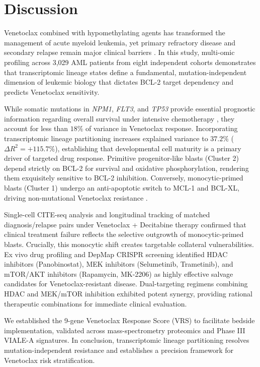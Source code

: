 \documentclass[11pt,a4paper]{article}
\begin{document}
\section{Discussion}

Venetoclax combined with hypomethylating agents has transformed the management of acute myeloid leukemia, yet primary refractory disease and secondary relapse remain major clinical barriers \cite{dinardo2020nejm}. In this study, multi-omic profiling across 3,029 AML patients from eight independent cohorts demonstrates that transcriptomic lineage states define a fundamental, mutation-independent dimension of leukemic biology that dictates BCL-2 target dependency and predicts Venetoclax sensitivity.

While somatic mutations in \textit{NPM1}, \textit{FLT3}, and \textit{TP53} provide essential prognostic information regarding overall survival under intensive chemotherapy \cite{dohner2017eln,papaemmanuil2016genomic}, they account for less than $18\%$ of variance in Venetoclax response. Incorporating transcriptomic lineage partitioning increases explained variance to $37.2\%$ ($\Delta R^2=+115.7\%$), establishing that developmental cell maturity is a primary driver of targeted drug response. Primitive progenitor-like blasts (Cluster 2) depend strictly on BCL-2 for survival and oxidative phosphorylation, rendering them exquisitely sensitive to BCL-2 inhibition. Conversely, monocytic-primed blasts (Cluster 1) undergo an anti-apoptotic switch to MCL-1 and BCL-XL, driving non-mutational Venetoclax resistance \cite{pei2020monocytic,moujalled2019mcl1,ramsey2018mcl1}.

Single-cell CITE-seq analysis and longitudinal tracking of matched diagnosis\slash relapse pairs under Venetoclax + Decitabine therapy confirmed that clinical treatment failure reflects the selective outgrowth of monocytic-primed blasts. Crucially, this monocytic shift creates targetable collateral vulnerabilities. Ex vivo drug profiling and DepMap CRISPR screening identified HDAC inhibitors (Panobinostat), MEK inhibitors (Selumetinib, Trametinib), and mTOR\slash AKT inhibitors (Rapamycin, MK-2206) as highly effective salvage candidates for Venetoclax-resistant disease. Dual-targeting regimens combining HDAC and MEK\slash mTOR inhibition exhibited potent synergy, providing rational therapeutic combinations for immediate clinical evaluation.

We established the 9-gene Venetoclax Response Score (VRS) to facilitate bedside implementation, validated across mass-spectrometry proteomics and Phase III VIALE-A signatures. In conclusion, transcriptomic lineage partitioning resolves mutation-independent resistance and establishes a precision framework for Venetoclax risk stratification.
\end{document}
